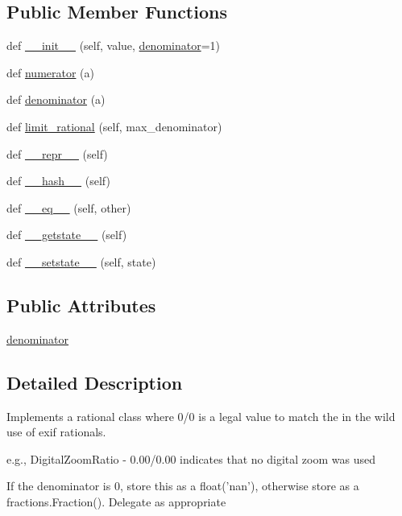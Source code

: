 \subsection*{Public Member Functions}
\begin{DoxyCompactItemize}
\item 
def \hyperlink{classPIL_1_1TiffImagePlugin_1_1IFDRational_ae0540e91ccbff4982de3ab0435b073b4}{\+\_\+\+\_\+init\+\_\+\+\_\+} (self, value, \hyperlink{classPIL_1_1TiffImagePlugin_1_1IFDRational_a206df1df975cff0eafdd55816b368fb7}{denominator}=1)
\item 
def \hyperlink{classPIL_1_1TiffImagePlugin_1_1IFDRational_a77a39e91da13c845ea0744be74b86993}{numerator} (a)
\item 
def \hyperlink{classPIL_1_1TiffImagePlugin_1_1IFDRational_a5376019d21a14685123b310f21e566fb}{denominator} (a)
\item 
def \hyperlink{classPIL_1_1TiffImagePlugin_1_1IFDRational_a5ea31df3e8853393a5ae836603c84a23}{limit\+\_\+rational} (self, max\+\_\+denominator)
\item 
def \hyperlink{classPIL_1_1TiffImagePlugin_1_1IFDRational_a82ca8eb38838e9812b6acb2ae53245c8}{\+\_\+\+\_\+repr\+\_\+\+\_\+} (self)
\item 
def \hyperlink{classPIL_1_1TiffImagePlugin_1_1IFDRational_a60befd7c9c13422b258be625d1b31034}{\+\_\+\+\_\+hash\+\_\+\+\_\+} (self)
\item 
def \hyperlink{classPIL_1_1TiffImagePlugin_1_1IFDRational_afba2c44309caede82e9e585c3e6d8ee6}{\+\_\+\+\_\+eq\+\_\+\+\_\+} (self, other)
\item 
def \hyperlink{classPIL_1_1TiffImagePlugin_1_1IFDRational_a18b4be358cfd4c1d9a5d5c2205cf051e}{\+\_\+\+\_\+getstate\+\_\+\+\_\+} (self)
\item 
def \hyperlink{classPIL_1_1TiffImagePlugin_1_1IFDRational_aabebf2eb131860a56733bc221aced9e5}{\+\_\+\+\_\+setstate\+\_\+\+\_\+} (self, state)
\end{DoxyCompactItemize}
\subsection*{Public Attributes}
\begin{DoxyCompactItemize}
\item 
\hyperlink{classPIL_1_1TiffImagePlugin_1_1IFDRational_a206df1df975cff0eafdd55816b368fb7}{denominator}
\end{DoxyCompactItemize}


\subsection{Detailed Description}
\begin{DoxyVerb}Implements a rational class where 0/0 is a legal value to match
the in the wild use of exif rationals.

e.g., DigitalZoomRatio - 0.00/0.00  indicates that no digital zoom was used
\end{DoxyVerb}
\begin{DoxyVerb}If the denominator is 0, store this as a float('nan'), otherwise store
as a fractions.Fraction(). Delegate as appropriate\end{DoxyVerb}
 

